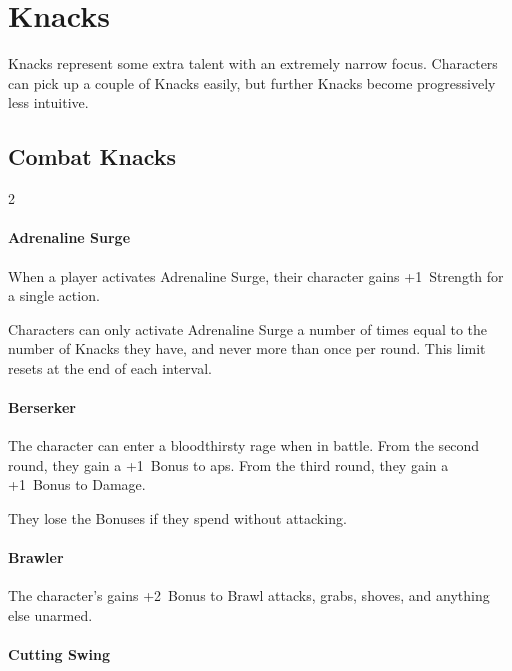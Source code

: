 \chapter[Hall of Knacks]{Knacks}
\label{knacks}

\noindent
Knacks represent some extra talent with an extremely narrow focus.
Characters can pick up a couple of Knacks easily, but further Knacks become progressively less intuitive.%

\section{Combat Knacks}

\begin{multicols}{2}

\subsubsection{Adrenaline Surge}
\label{adrenalinesurge}

When a player activates Adrenaline Surge, their character gains +1~Strength for a single action.

Characters can only activate Adrenaline Surge a number of times equal to the number of Knacks they have, and never more than once per round.
This limit resets at the end of each \gls{interval}.

\subsubsection{Berserker}

The character can enter a bloodthirsty rage when in battle.
From the second \gls{round}, they gain a +1~Bonus to \glspl{ap}.
From the third \gls{round}, they gain a +1~Bonus to Damage.

They lose the Bonuses if they spend  without attacking.

\subsubsection{Brawler}

The character's gains +2~Bonus to Brawl attacks, grabs, shoves, and anything else unarmed.

\subsubsection{Cutting Swing}


\end{multicols}
